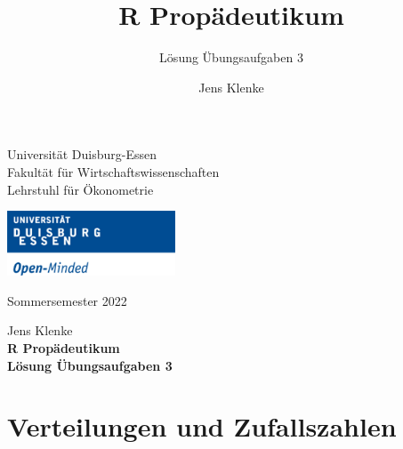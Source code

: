 \documentclass[12pt,a4paper]{article}
\title{R Propädeutikum}
\subtitle{Lösung Übungsaufgaben 3}
\author{Jens Klenke}
\date{}
\begin{document}





\restoregeometry



\begin{minipage}{0.6\textwidth}
Universität Duisburg-Essen\\
Fakultät für Wirtschaftswissenschaften\\
Lehrstuhl für Ökonometrie\\
\end{minipage}

	\begin{flushright}
	\vspace{-3cm}
	\includegraphics*[width=5cm]{includes/duelogo_en.png}\\
	\vspace{.125cm}
	\end{flushright}
\hspace{-0.005cm}Sommersemester 2022

\vspace{0.05cm}

\begin{center}
	\vspace{.25cm}
	Jens Klenke \hspace{.5cm}  \\
	\vspace{.25cm}
	\textbf{\Large{R Propädeutikum}}\\
	\vspace{.25cm}
	\textbf{\large{Lösung Übungsaufgaben 3}}\\
	\vspace{.125cm}
\end{center}





\hypertarget{verteilungen-und-zufallszahlen}{%
\section{Verteilungen und
Zufallszahlen}\label{verteilungen-und-zufallszahlen}}
\end{document}
